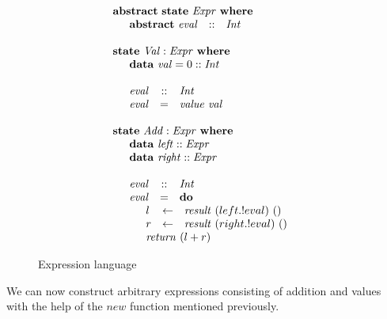 \documentclass[authoryear,preprint]{sigplanconf}
\begin{document}
\begin{figure}
\begin{displaymath}
\begin{array}{l}
\mathbf{abstract}~\mathbf{state}~\mathit{Expr}~\mathbf{where} \\
\quad \begin{array}{lcl}
\mathbf{abstract}~\mathit{eval} & :: & \mathit{Int}
\end{array} \\\\
\mathbf{state}~\mathit{Val} : \mathit{Expr}~\mathbf{where} \\
\quad \begin{array}{lcl}
\multicolumn{3}{l}{\mathbf{data}~\mathit{val} = 0  :: \mathit{Int}} \\\\
\mathit{eval} & :: & \mathit{Int} \\
\mathit{eval} & = & \mathit{value}~\mathit{val}
\end{array} \\\\
\mathbf{state}~\mathit{Add} : \mathit{Expr}~\mathbf{where} \\
\quad \begin{array}{lcl}
\multicolumn{3}{l}{\mathbf{data}~\mathit{left}  :: \mathit{Expr}} \\
\multicolumn{3}{l}{\mathbf{data}~\mathit{right}  :: \mathit{Expr}} \\\\
\mathit{eval} & :: & \mathit{Int} \\
\mathit{eval} & = & \mathbf{do} \\
\multicolumn{3}{l}{\quad \begin{array}{lcl}
    l & \leftarrow & \mathit{result}~(left.!eval)~() \\
    r & \leftarrow & \mathit{result}~(right.!eval)~() \\
    \multicolumn{3}{l}{\mathit{return}~(l + r)}
    \end{array}} 
\end{array} 
\end{array}
\end{displaymath}
\caption{Expression language}
\label{fig:razor}
\end{figure}

We can now construct arbitrary expressions consisting of addition and values with the help of the $\mathit{new}$ function mentioned previously.
\end{document}
